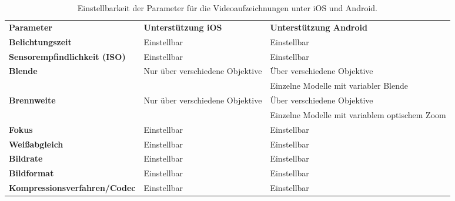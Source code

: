 \begin{table}[H]
    \begin{tabularx}{\textwidth}{ |l|X|X| }
        \hline
        \textbf{Parameter} & \textbf{Unterstützung iOS} & \textbf{Unterstützung Android}  \\
        \Xhline{0.5mm}
        \textbf{Belichtungszeit} & Einstellbar \cite{iOS_VideoSettings, iOS_Exposure} & Einstellbar \cite{Android_CaptureRequest} \\
        \hline
        \textbf{Sensorempfindlichkeit (ISO)} & Einstellbar \cite{iOS_VideoSettings, iOS_Exposure} & Einstellbar \cite{Android_CaptureRequest}  \\
        \hline
        \textbf{Blende} & Nur über verschiedene Objektive & Über verschiedene Objektive \\ & & Einzelne Modelle mit variabler Blende \cite{VariableAperture_Smartphones} \\
        \hline
        \textbf{Brennweite} & Nur über verschiedene Objektive & Über verschiedene Objektive \\ & & Einzelne Modelle mit variablem optischem Zoom \cite{Sony_VariableZoom} \\
        \hline
        \textbf{Fokus} & Einstellbar \cite{iOS_Focus} & Einstellbar \cite{Android_CaptureRequest} \\
        \hline
        \textbf{Weißabgleich} & Einstellbar \cite{iOS_WhiteBalance} & Einstellbar \cite{Android_CaptureRequest} \\
        \hline
        \textbf{Bildrate} & Einstellbar \cite{iOS_Format} & Einstellbar \cite{Android_CaptureRequest} \\
        \hline
        \textbf{Bildformat} & Einstellbar \cite{iOS_Format} & Einstellbar \cite{Android_CaptureRequest} \\
        \hline
        \textbf{Kompressionsverfahren/Codec} & Einstellbar \cite{iOS_VideoSettings} & Einstellbar \cite{Android_MediaCodec} \\
        \hline
    \end{tabularx}
    \caption{Einstellbarkeit der Parameter für die Videoaufzeichnungen unter iOS und Android.}
    \label{tab:parameter_support}
\end{table}
